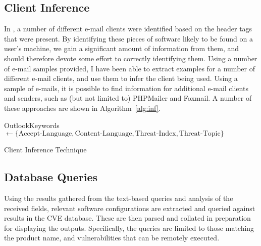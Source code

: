 \subsection{Client Inference}

In \cite{nurse2015investigating}, a number of different e-mail clients were identified based on the header tags that were present. By identifying these pieces of software likely to be found on a user's machine, we gain a significant amount of information from them, and should therefore devote some effort to correctly identifying them.  Using a number of e-mail samples provided, I have been able to extract examples for a number of different e-mail clients, and use them to infer the client being used.  Using a sample of e-mails, it is possible to find information for additional e-mail clients and senders, such as (but not limited to) PHPMailer and Foxmail.  A number of these approaches are shown in Algorithm~\ref{alg:inf}.

\begin{algorithm}
    OutlookKeywords ${}\gets\{ \text{Accept-Language}, \text{Content-Language}, \text{Threat-Index}, \text{Threat-Topic} \}$\;
	\caption{Client Inference Technique}
	\label{alg:inf}
\end{algorithm}


\subsection{Database Queries}

Using the results gathered from the text-based queries and analysis of the
received fields, relevant software configurations are extracted and queried
against results in the CVE database.  These are then parsed and collated in
preparation for displaying the outputs. Specifically, the queries are limited
to those matching the product name, and vulnerabilities that can be remotely
executed.

